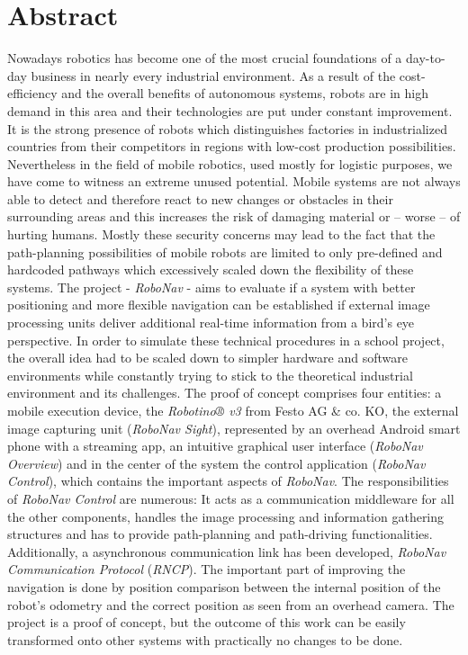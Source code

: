 \section*{Abstract}

Nowadays robotics has become one of the most crucial foundations of a day-to-day business in nearly every industrial environment. As a result of the cost-efficiency and the overall benefits of autonomous systems, robots are in high demand in this area and their technologies are put under constant improvement. It is the strong presence of robots which distinguishes factories in industrialized countries from their competitors in regions with low-cost production possibilities. Nevertheless in the field of mobile robotics, used mostly for logistic purposes, we have come to witness an extreme unused potential. Mobile systems are not always able to detect and therefore react to new changes or obstacles in their surrounding areas and this increases the risk of damaging material or – worse – of hurting humans.  Mostly these security concerns may lead to the fact that the path-planning possibilities of mobile robots are limited to only pre-defined and hardcoded pathways which excessively scaled down the flexibility of these systems.
The project - \textit{RoboNav} - aims to evaluate if a system with better positioning and more flexible navigation can be established if external image processing units deliver additional real-time information from a bird's eye perspective. 
In order to simulate these technical procedures in a school project, the overall idea had to be scaled down to simpler hardware and software environments while constantly trying to stick to the theoretical industrial environment and its challenges. The proof of concept comprises four entities: a mobile execution device, the \textit{Robotino® v3} from Festo AG \& co. KO, the external image capturing unit (\textit{RoboNav Sight}),  represented by an overhead Android smart phone with a streaming app, an intuitive graphical user interface (\textit{RoboNav Overview}) and in the center of the system the control application (\textit{RoboNav Control}), which contains the important aspects of \textit{RoboNav}. The responsibilities of \textit{RoboNav Control} are numerous: It acts as a communication middleware for all the other components, handles the image processing and information gathering structures and has to provide path-planning and path-driving functionalities. Additionally, a asynchronous communication link has been developed, \textit{RoboNav Communication Protocol} (\textit{RNCP}). The important part of improving the navigation is done by position comparison between the internal position of the robot's odometry and the correct position as seen from an overhead camera. The project is a proof of concept, but the outcome of this work can be easily transformed onto other systems with practically no changes to be done.
